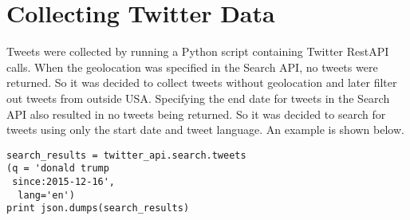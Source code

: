 \documentclass{sig-alternate-05-2015}
\begin{document}
%
\author{
%
%
\alignauthor
Gopal Menon\\
       \\
       \\
       \\
}


\maketitle



%
%



%
%

%
%


\section{Collecting Twitter Data}
Tweets were collected by running a Python script containing Twitter RestAPI calls. When the geolocation was specified in the Search API, no tweets were returned. So it was decided to collect tweets without geolocation and later filter out tweets from outside USA. Specifying the end date for tweets in the Search API also resulted in no tweets being returned. So it was decided to search for tweets using only the start date and tweet language. An example is shown below.
\begin{lstlisting}
search_results = twitter_api.search.tweets 
(q = 'donald trump
 since:2015-12-16',
  lang='en') 
print json.dumps(search_results)
\end{lstlisting}
\end{document}
